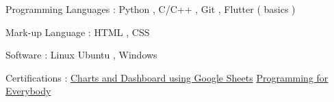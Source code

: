 
\begin{cvskills}

  \cvskill
    { Programming Languages : } %
    { Python , C/C++ , Git , Flutter ( basics ) }

  \cvskill
    { Mark-up Language : } %
    { HTML , CSS }

  \cvskill
    { Software : } %
    { Linux Ubuntu , Windows }

  \cvskill
    { Certifications : } %
    { \href{https://coursera.org/share/a9fe54335cfbac27c608068e7c7cbc6d}{Charts and Dashboard using Google Sheets} \href{https://coursera.org/share/b38c45f0f63616189f487fe7c5785879}{Programming for Everybody }}


\end{cvskills}
